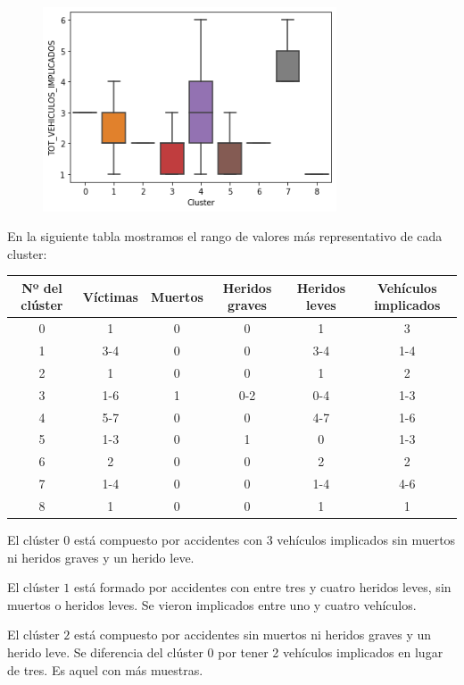 \documentclass[a4]{article}
\begin{document}
\begin{figure}[H]
  \includegraphics[width=87mm]{imagenes/c2_kmeans_vi}
\end{figure}

\newpage
En la siguiente tabla mostramos el rango de valores más representativo de cada cluster:

\begin{center}
\begin{tabular}{|c|c|c|c|c|c|}
\hline
\multicolumn{1}{|c|}{\textbf{Nº del clúster}} & \textbf{Víctimas} & \textbf{Muertos} & \textbf{Heridos graves} & \textbf{Heridos leves} & \textbf{Vehículos implicados}\\ \hline
  0  & 1   & 0 & 0   & 1   & 3   \\ \hline
  1  & 3-4 & 0 & 0   & 3-4 & 1-4 \\ \hline
  2  & 1   & 0 & 0   & 1   & 2   \\ \hline
  3  & 1-6 & 1 & 0-2 & 0-4 & 1-3 \\ \hline
  4  & 5-7 & 0 & 0   & 4-7 & 1-6 \\ \hline
  5  & 1-3 & 0 & 1   & 0   & 1-3 \\ \hline
  6  & 2   & 0 & 0   & 2   & 2   \\ \hline
  7  & 1-4 & 0 & 0   & 1-4 & 4-6 \\ \hline
  8  & 1   & 0 & 0   & 1   & 1   \\ \hline
\end{tabular}
\end{center}

El clúster $0$ está compuesto por accidentes con 3 vehículos implicados sin muertos ni heridos graves y un herido leve.

El clúster $1$ está formado por accidentes con entre tres y cuatro heridos leves, sin muertos o heridos leves. Se vieron implicados entre uno y cuatro vehículos.

El clúster $2$ está compuesto por accidentes sin muertos ni heridos graves y un herido leve. Se diferencia del clúster 0 por tener 2 vehículos implicados en lugar de tres. Es aquel con más muestras.
\end{document}
